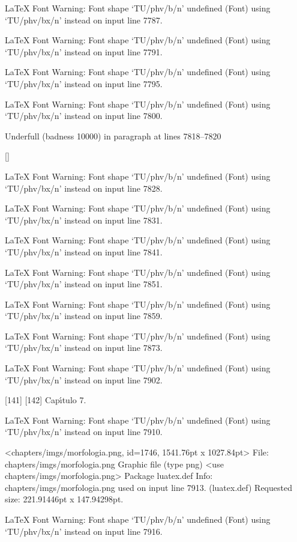 LaTeX Font Warning: Font shape `TU/phv/b/n' undefined
(Font)              using `TU/phv/bx/n' instead on input line 7787.


LaTeX Font Warning: Font shape `TU/phv/b/n' undefined
(Font)              using `TU/phv/bx/n' instead on input line 7791.


LaTeX Font Warning: Font shape `TU/phv/b/n' undefined
(Font)              using `TU/phv/bx/n' instead on input line 7795.


LaTeX Font Warning: Font shape `TU/phv/b/n' undefined
(Font)              using `TU/phv/bx/n' instead on input line 7800.


Underfull \hbox (badness 10000) in paragraph at lines 7818--7820

 []


LaTeX Font Warning: Font shape `TU/phv/b/n' undefined
(Font)              using `TU/phv/bx/n' instead on input line 7828.


LaTeX Font Warning: Font shape `TU/phv/b/n' undefined
(Font)              using `TU/phv/bx/n' instead on input line 7831.


LaTeX Font Warning: Font shape `TU/phv/b/n' undefined
(Font)              using `TU/phv/bx/n' instead on input line 7841.


LaTeX Font Warning: Font shape `TU/phv/b/n' undefined
(Font)              using `TU/phv/bx/n' instead on input line 7851.


LaTeX Font Warning: Font shape `TU/phv/b/n' undefined
(Font)              using `TU/phv/bx/n' instead on input line 7859.


LaTeX Font Warning: Font shape `TU/phv/b/n' undefined
(Font)              using `TU/phv/bx/n' instead on input line 7873.


LaTeX Font Warning: Font shape `TU/phv/b/n' undefined
(Font)              using `TU/phv/bx/n' instead on input line 7902.

[141] [142]
Cap\'{\i }tulo 7.

LaTeX Font Warning: Font shape `TU/phv/b/n' undefined
(Font)              using `TU/phv/bx/n' instead on input line 7910.

<chapters/imgs/morfologia.png, id=1746, 1541.76pt x 1027.84pt>
File: chapters/imgs/morfologia.png Graphic file (type png)
<use chapters/imgs/morfologia.png>
Package luatex.def Info: chapters/imgs/morfologia.png  used on input line 7913.
(luatex.def)             Requested size: 221.91446pt x 147.94298pt.

LaTeX Font Warning: Font shape `TU/phv/b/n' undefined
(Font)              using `TU/phv/bx/n' instead on input line 7916.


